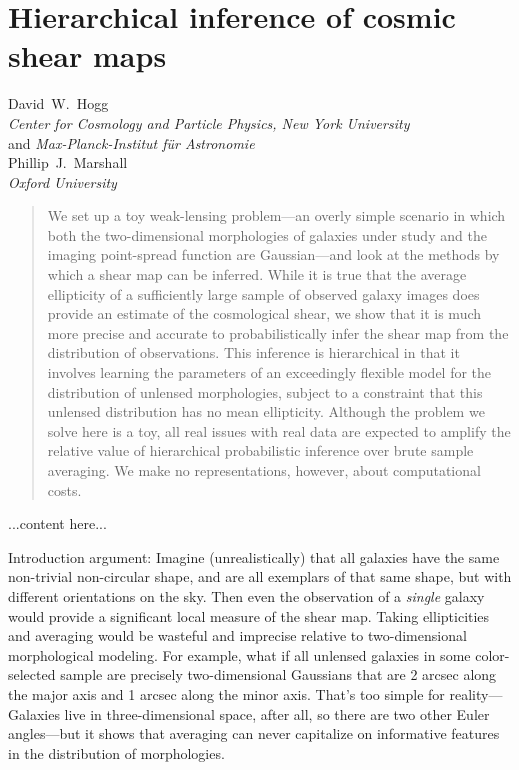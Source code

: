 \documentclass[12pt]{article}
\begin{document}
\section*{Hierarchical inference of cosmic shear maps}
\noindent
David~W.~Hogg \\
\textsl{Center for Cosmology and Particle Physics, New York University} \\
and \textsl{Max-Planck-Institut f\"ur Astronomie} \\[1ex]
Phillip~J.~Marshall \\
\textsl{Oxford University}

\begin{abstract}
We set up a toy weak-lensing problem---an overly simple scenario in
which both the two-dimensional morphologies of galaxies under study
and the imaging point-spread function are Gaussian---and look at the
methods by which a shear map can be inferred.  While it is true that
the average ellipticity of a sufficiently large sample of observed
galaxy images does provide an estimate of the cosmological shear, we
show that it is much more precise and accurate to probabilistically
infer the shear map from the distribution of observations.  This
inference is hierarchical in that it involves learning the parameters
of an exceedingly flexible model for the distribution of unlensed
morphologies, subject to a constraint that this unlensed distribution
has no mean ellipticity.  Although the problem we solve here is a toy,
all real issues with real data are expected to amplify the relative
value of hierarchical probabilistic inference over brute sample
averaging.  We make no representations, however, about computational
costs.
\end{abstract}

...content here...

Introduction argument: Imagine (unrealistically) that all galaxies
have the same non-trivial non-circular shape, and are all exemplars of
that same shape, but with different orientations on the sky.  Then
even the observation of a \emph{single} galaxy would provide a
significant local measure of the shear map.  Taking ellipticities and
averaging would be wasteful and imprecise relative to two-dimensional
morphological modeling.  For example, what if all unlensed galaxies in
some color-selected sample are precisely two-dimensional Gaussians
that are 2 arcsec along the major axis and 1 arcsec along the minor
axis.  That's too simple for reality---Galaxies live in
three-dimensional space, after all, so there are two other Euler
angles---but it shows that averaging can never capitalize on
informative features in the distribution of morphologies.
\end{document}
